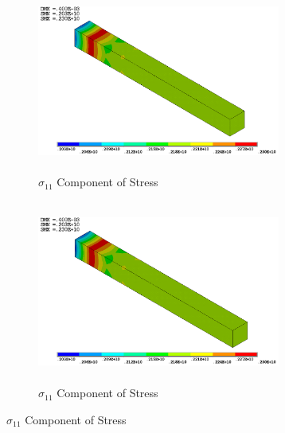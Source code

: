 \documentclass[12pt,a4paper,twoside,openright]{report}
\begin{document}
\begin{figure}[htbp!]
     \captionsetup[subfigure]{justification=centering}
     \begin{subfigure}[b]{0.4\textwidth}
         \includegraphics[width=8cm,height=6cm]{15.Ansys_SX.png}
         \caption{$\sigma_{11}$ Component of Stress}
         \label{fig:X Component of Stress}
     \end{subfigure}
     \hspace{1.85cm}
     \begin{subfigure}[b]{0.4\textwidth}
         \includegraphics[width=8cm,height=6cm]{18.User_SX.png}
         \caption{$\sigma_{11}$ Component of Stress}
         \label{fig:X Component of Stress2}
     \end{subfigure}
\end{figure}
\FloatBarrier
\end{document}
